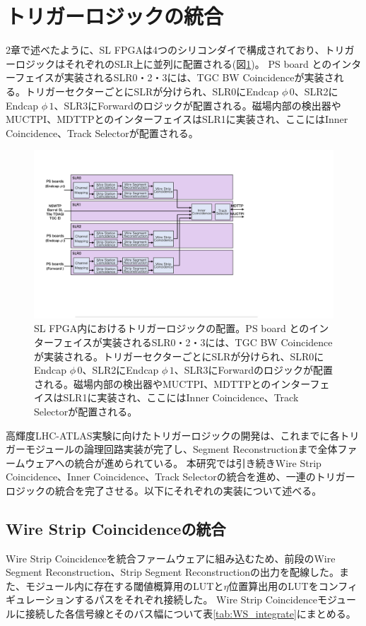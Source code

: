 \section{トリガーロジックの統合}
\label{sec_TriggerIntegration}
2章で述べたように、SL FPGAは4つのシリコンダイで構成されており、トリガーロジックはそれぞれのSLR上に並列に配置される(図\ref{Trigger_floor})。
PS board とのインターフェイスが実装されるSLR0・2・3には、TGC BW Coincidenceが実装される。トリガーセクターごとにSLRが分けられ、SLR0にEndcap $\phi\,0$、SLR2にEndcap $\phi\,1$、SLR3にForwardのロジックが配置される。磁場内部の検出器やMUCTPI、MDTTPとのインターフェイスはSLR1に実装され、ここにはInner Coincidence、Track Selectorが配置される。

\begin{figure} 
\centering
\includegraphics[width=16cm]{fig/SL/Trigger_floor.pdf}
\caption[SL FPGA内におけるトリガーロジックの配置]{SL FPGA内におけるトリガーロジックの配置。PS board とのインターフェイスが実装されるSLR0・2・3には、TGC BW Coincidenceが実装される。トリガーセクターごとにSLRが分けられ、SLR0にEndcap $\phi\,0$、SLR2にEndcap $\phi\,1$、SLR3にForwardのロジックが配置される。磁場内部の検出器やMUCTPI、MDTTPとのインターフェイスはSLR1に実装され、ここにはInner Coincidence、Track Selectorが配置される。}
\label{Trigger_floor}
\end{figure}

高輝度LHC-ATLAS実験に向けたトリガーロジックの開発は、これまでに各トリガーモジュールの論理回路実装が完了し、Segment Reconstructionまで全体ファームウェアへの統合が進められている。
本研究では引き続きWire Strip Coincidence、Inner Coincidence、Track Selectorの統合を進め、一連のトリガーロジックの統合を完了させる。以下にそれぞれの実装について述べる。

\subsection{Wire Strip Coincidenceの統合}
Wire Strip Coincidenceを統合ファームウェアに組み込むため、前段のWire Segment Reconstruction、Strip Segment Reconstructionの出力を配線した。また、モジュール内に存在する\pt  閾値概算用のLUTと$\eta$位置算出用のLUTをコンフィギュレーションするパスをそれぞれ接続した。
Wire Strip Coincidenceモジュールに接続した各信号線とそのバス幅について表\ref{tab:WS_integrate}にまとめる。


